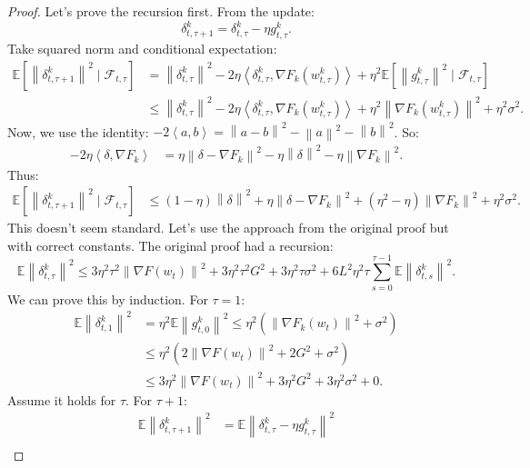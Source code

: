 \documentclass{article}
\newcommand{\norm}[1]{\left\| #1 \right\|}
\newcommand{\inner}[2]{\left\langle #1, #2 \right\rangle}
\begin{document}
\begin{proof}
Let's prove the recursion first. From the update:
\begin{equation}
    \delta_{t,\tau+1}^k = \delta_{t,\tau}^k - \eta g_{t,\tau}^k.
\end{equation}
Take squared norm and conditional expectation:
\begin{align}
\mathbb{E}[\norm{\delta_{t,\tau+1}^k}^2 \mid \mathcal{F}_{t,\tau}]
&= \norm{\delta_{t,\tau}^k}^2 - 2\eta \inner{\delta_{t,\tau}^k}{\nabla F_k(w_{t,\tau}^k)} + \eta^2 \mathbb{E}[\norm{g_{t,\tau}^k}^2 \mid \mathcal{F}_{t,\tau}] \\
&\le \norm{\delta_{t,\tau}^k}^2 - 2\eta \inner{\delta_{t,\tau}^k}{\nabla F_k(w_{t,\tau}^k)} + \eta^2 \norm{\nabla F_k(w_{t,\tau}^k)}^2 + \eta^2 \sigma^2.
\end{align}
Now, we use the identity: $-2\inner{a}{b} = \norm{a-b}^2 - \norm{a}^2 - \norm{b}^2$. So:
\begin{align}
-2\eta \inner{\delta}{\nabla F_k} &= \eta \norm{\delta - \nabla F_k}^2 - \eta \norm{\delta}^2 - \eta \norm{\nabla F_k}^2.
\end{align}
Thus:
\begin{align}
\mathbb{E}[\norm{\delta_{t,\tau+1}^k}^2 \mid \mathcal{F}_{t,\tau}]
&\le (1-\eta) \norm{\delta}^2 + \eta \norm{\delta - \nabla F_k}^2 + (\eta^2 - \eta) \norm{\nabla F_k}^2 + \eta^2 \sigma^2.
\end{align}
This doesn't seem standard. Let's use the approach from the original proof but with correct constants. The original proof had a recursion:
\begin{equation}
    \mathbb{E}\norm{\delta_{t,\tau}^k}^2 \le 3\eta^2 \tau^2 \norm{\nabla F(w_t)}^2 + 3\eta^2 \tau^2 G^2 + 3\eta^2 \tau \sigma^2 + 6L^2 \eta^2 \tau \sum_{s=0}^{\tau-1} \mathbb{E}\norm{\delta_{t,s}^k}^2.
\end{equation}
We can prove this by induction. For $\tau=1$:
\begin{align}
\mathbb{E}\norm{\delta_{t,1}^k}^2 &= \eta^2 \mathbb{E}\norm{g_{t,0}^k}^2 \le \eta^2 (\norm{\nabla F_k(w_t)}^2 + \sigma^2) \\
&\le \eta^2 (2\norm{\nabla F(w_t)}^2 + 2G^2 + \sigma^2) \\
&\le 3\eta^2 \norm{\nabla F(w_t)}^2 + 3\eta^2 G^2 + 3\eta^2 \sigma^2 + 0.
\end{align}
Assume it holds for $\tau$. For $\tau+1$:
\begin{align}
\mathbb{E}\norm{\delta_{t,\tau+1}^k}^2 &= \mathbb{E}\norm{\delta_{t,\tau}^k - \eta g_{t,\tau}^k}^2 \\

\end{align}
\end{proof}
\end{document}
